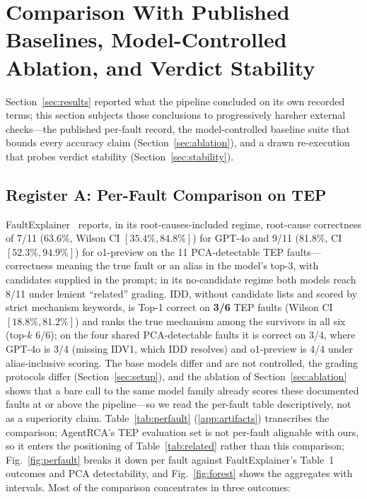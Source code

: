 \documentclass[preprint,10pt]{elsarticle}
\begin{document}
\section{Comparison With Published Baselines, Model-Controlled Ablation, and Verdict Stability}
\label{sec:comparison}

Section~\ref{sec:results} reported what the pipeline concluded on its own recorded terms; this section subjects those conclusions to progressively harsher external checks---the published per-fault record, the model-controlled baseline suite that bounds every accuracy claim (Section~\ref{sec:ablation}), and a drawn re-execution that probes verdict stability (Section~\ref{sec:stability}).

\subsection{Register A: Per-Fault Comparison on TEP}
FaultExplainer~\cite{khan2024faultexplainer} reports, in its root-causes-included regime, root-cause correctness of 7/11 (63.6\%, Wilson CI $[35.4\%,84.8\%]$) for GPT-4o and 9/11 (81.8\%, CI $[52.3\%,94.9\%]$) for o1-preview on the 11 PCA-detectable TEP faults---correctness meaning the true fault or an alias in the model's top-3, with candidates supplied in the prompt; in its no-candidate regime both models reach 8/11 under lenient ``related'' grading. IDD, without candidate lists and scored by strict mechanism keywords, is Top-1 correct on \textbf{3/6} TEP faults (Wilson CI $[18.8\%,81.2\%]$) and ranks the true mechanism among the survivors in all six (top-$k$ 6/6); on the four shared PCA-detectable faults it is correct on 3/4, where GPT-4o is 3/4 (missing IDV1, which IDD resolves) and o1-preview is 4/4 under alias-inclusive scoring. The base models differ and are not controlled, the grading protocols differ (Section~\ref{sec:setup}), and the ablation of Section~\ref{sec:ablation} shows that a bare call to the same model family already scores these documented faults at or above the pipeline---so we read the per-fault table descriptively, not as a superiority claim. Table~\ref{tab:perfault} (\ref{app:artifacts}) transcribes the comparison; AgentRCA's TEP evaluation set is not per-fault alignable with ours, so it enters the positioning of Table~\ref{tab:related} rather than this comparison; Fig.~\ref{fig:perfault} breaks it down per fault against FaultExplainer's Table~1 outcomes and PCA detectability, and Fig.~\ref{fig:forest} shows the aggregates with intervals. Most of the comparison concentrates in three outcomes:
\end{document}
